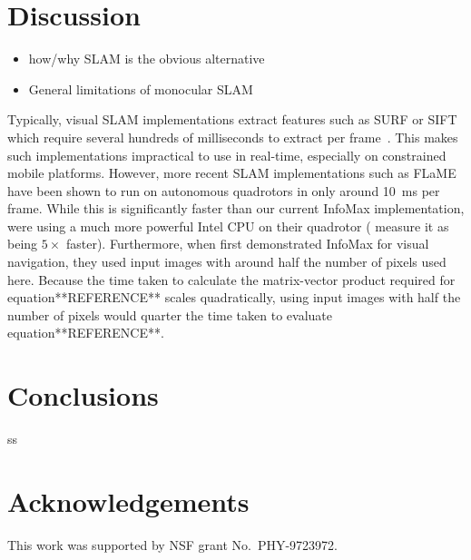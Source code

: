 \documentclass[letterpaper]{article}
\begin{document}
\section{Discussion}
\begin{itemize}
    \item how/why SLAM is the obvious alternative
    \item General limitations of monocular SLAM
\end{itemize}
Typically, visual SLAM implementations extract features such as SURF or SIFT which require several hundreds of milliseconds to extract per frame~\citep{Bay2006}. 
This makes such implementations impractical to use in real-time, especially on constrained mobile platforms. 
However, more recent SLAM implementations such as FLaME~\citep{Greene2017} have been shown to run on autonomous quadrotors in only around \SI{10}{\milli\second} per frame. 
While this is significantly faster than our current InfoMax implementation, \citet{Greene2017} were using a much more powerful Intel CPU on their quadrotor (\citet{Biddulph2018} measure it as being $5\times$ faster). 
Furthermore, when \citet{Baddeley2012} first demonstrated InfoMax for visual navigation, they used input images with around half the number of pixels used here. 
Because the time taken to calculate the matrix-vector product required for equation**REFERENCE** scales quadratically, using input images with half the number of pixels would quarter the time taken to evaluate equation**REFERENCE**.

\section{Conclusions}
ss
\section{Acknowledgements}

This work was supported by NSF grant No.\ PHY-9723972.

\footnotesize

\end{document}
